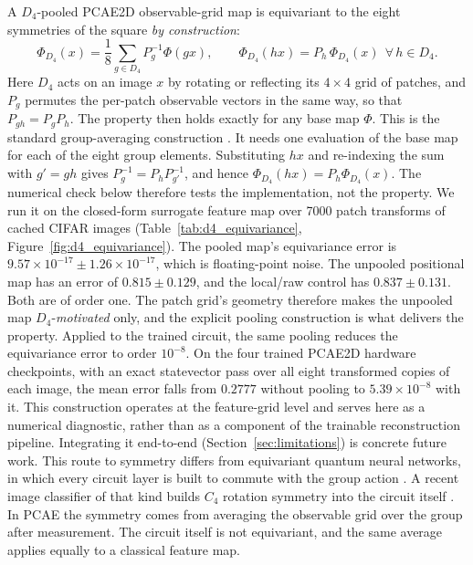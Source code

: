 \documentclass[pdflatex,sn-basic]{sn-jnl}
\begin{document}
A $D_4$-pooled PCAE2D observable-grid map is equivariant to the eight symmetries of the square \emph{by construction}:
\begin{equation}
  \Phi_{D_4}(x)=\frac{1}{8}\sum_{g\in D_4}P_g^{-1}\Phi(gx),
  \qquad
  \Phi_{D_4}(hx)=P_h\,\Phi_{D_4}(x)\ \ \forall\, h\in D_4.
\end{equation}
Here $D_4$ acts on an image $x$ by rotating or reflecting its $4\times4$ grid of patches, and $P_g$ permutes the per-patch observable vectors in the same way, so that $P_{gh}=P_gP_h$.
The property then holds exactly for any base map $\Phi$.
This is the standard group-averaging construction \citep{Puny2022}.
It needs one evaluation of the base map for each of the eight group elements.
Substituting $hx$ and re-indexing the sum with $g'=gh$ gives $P_g^{-1}=P_hP_{g'}^{-1}$, and hence $\Phi_{D_4}(hx)=P_h\Phi_{D_4}(x)$.
The numerical check below therefore tests the implementation, not the property.
We run it on the closed-form surrogate feature map over 7000 patch transforms of cached CIFAR images (Table~\ref{tab:d4_equivariance}, Figure~\ref{fig:d4_equivariance}).
The pooled map's equivariance error is $9.57\times10^{-17}\pm1.26\times10^{-17}$, which is floating-point noise.
The unpooled positional map has an error of $0.815\pm0.129$, and the local/raw control has $0.837\pm0.131$.
Both are of order one.
The patch grid's geometry therefore makes the unpooled map $D_4$-\emph{motivated} only, and the explicit pooling construction is what delivers the property.
Applied to the trained circuit, the same pooling reduces the equivariance error to order $10^{-8}$.
On the four trained PCAE2D hardware checkpoints, with an exact statevector pass over all eight transformed copies of each image, the mean error falls from $0.2777$ without pooling to $5.39\times10^{-8}$ with it.
This construction operates at the feature-grid level and serves here as a numerical diagnostic, rather than as a component of the trainable reconstruction pipeline.
Integrating it end-to-end (Section~\ref{sec:limitations}) is concrete future work.
This route to symmetry differs from equivariant quantum neural networks, in which every circuit layer is built to commute with the group action \citep{Nguyen2024EQNN}.
A recent image classifier of that kind builds $C_4$ rotation symmetry into the circuit itself \citep{SanSebastianSein2025}.
In PCAE the symmetry comes from averaging the observable grid over the group after measurement.
The circuit itself is not equivariant, and the same average applies equally to a classical feature map.
\end{document}
